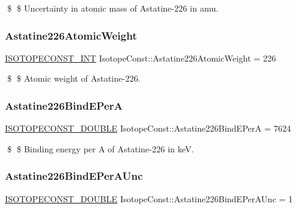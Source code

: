 \$ \$ Uncertainty in atomic mass of Astatine-\/226 in amu. \mbox{\label{group___isotope_const-_astatine-_at226_ga66a31dfb9da7f67f9e76b2f1312ede6a}} 
\subsubsection{\texorpdfstring{Astatine226\+Atomic\+Weight}{Astatine226AtomicWeight}}
{\footnotesize\ttfamily \mbox{\hyperlink{group___isotope_const-_macros_ga5f18360b3e99483a35c32d789e62621c}{I\+S\+O\+T\+O\+P\+E\+C\+O\+N\+S\+T\+\_\+\+I\+NT}} Isotope\+Const\+::\+Astatine226\+Atomic\+Weight = 226}

\$ \$ Atomic weight of Astatine-\/226. \mbox{\label{group___isotope_const-_astatine-_at226_ga840a57c19a67c86d686dc88a0ab35abf}} 
\subsubsection{\texorpdfstring{Astatine226\+Bind\+E\+PerA}{Astatine226BindEPerA}}
{\footnotesize\ttfamily \mbox{\hyperlink{group___isotope_const-_macros_ga8f45a7272ce02c0b4c65c44636ed719a}{I\+S\+O\+T\+O\+P\+E\+C\+O\+N\+S\+T\+\_\+\+D\+O\+U\+B\+LE}} Isotope\+Const\+::\+Astatine226\+Bind\+E\+PerA = 7624}

\$ \$ Binding energy per A of Astatine-\/226 in keV. \mbox{\label{group___isotope_const-_astatine-_at226_gabd91a13a96196a02988194d0368d75d8}} 
\subsubsection{\texorpdfstring{Astatine226\+Bind\+E\+Per\+A\+Unc}{Astatine226BindEPerAUnc}}
{\footnotesize\ttfamily \mbox{\hyperlink{group___isotope_const-_macros_ga8f45a7272ce02c0b4c65c44636ed719a}{I\+S\+O\+T\+O\+P\+E\+C\+O\+N\+S\+T\+\_\+\+D\+O\+U\+B\+LE}} Isotope\+Const\+::\+Astatine226\+Bind\+E\+Per\+A\+Unc = 1}

